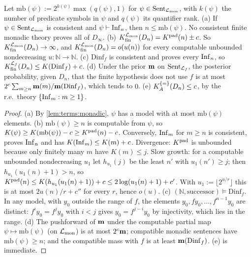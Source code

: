 \begin{theorem}\label{thm:terms:infinity}
Let $\mathrm{mb}(\psi):=2^{k(\psi)}\max(q(\psi),1)$ for $\psi\in\mathrm{Sent}_{\mathcal L_{\rm mon}}$, with $k(\psi)$ the number of predicate symbols in $\psi$ and $q(\psi)$ its quantifier rank.
(a) If $\psi\in\mathrm{Sent}_{\mathcal L_{\rm mon}}$ is consistent and $\psi\vdash\mathrm{Inf}_{n}$, then $n\le\mathrm{mb}(\psi)$. No consistent finite monadic theory proves all of $D_\infty$.
(b) $K_{\mathrm{fin}}^{\mathcal L_{\rm mon}}(D_n)=K^{\mathrm{pad}}(n)\pm c$. So $K_{\mathrm{fin}}^{\mathcal L_{\rm mon}}(D_n)\to\infty$, and $K_{\mathrm{fin}}^{\mathcal L_{\rm mon}}(D_n)=o(u(n))$ for every computable unbounded nondecreasing $u:\mathbb N\to\mathbb N$.
(c) $\mathrm{Dinf}_f$ is consistent and proves every $\mathrm{Inf}_{n}$, so $K_{\mathrm{fin}}^{\mathcal L_f}(D_n)\le K(\mathrm{Dinf}_f)+c$.
(d) Under the prior $\mathbf{m}$ on $\mathrm{Sent}_{\mathcal L_f}$, the posterior probability, given $D_n$, that the finite hypothesis does not use $f$ is at most $2^c\sum_{m\ge n}\mathbf{m}(m)/\mathbf{m}(\mathrm{Dinf}_f)$, which tends to $0$.
(e) $K_{A}^{\{=\}}(D_n)\le c$, by the r.e.\ theory $\{\mathrm{Inf}_{m}:m\ge1\}$.
\end{theorem}

\begin{proof}
(a) By \cref{lem:terms:monadic}, $\psi$ has a model with at most $\mathrm{mb}(\psi)$ elements. (b) $\mathrm{mb}(\psi)\ge n$ is computable from $\psi$, so $K(\psi)\ge K(\mathrm{mb}(\psi))-c\ge K^{\mathrm{pad}}(n)-c$. Conversely, $\mathrm{Inf}_{m}$ for $m\ge n$ is consistent, proves $\mathrm{Inf}_{n}$ and has $K(\mathrm{Inf}_{m})\le K(m)+c$. Divergence: $K^{\mathrm{pad}}$ is unbounded because only finitely many $m$ have $K(m)\le j$. Slow growth: for a computable unbounded nondecreasing $u_1$ let $h_{u_1}(j)$ be the least $n'$ with $u_1(n')\ge j$; then $h_{u_1}(u_1(n)+1)>n$, so $K^{\mathrm{pad}}(n)\le K(h_{u_1}(u_1(n)+1))+c\le2\log(u_1(n)+1)+c'$. With $u_1:=\lfloor2^{u/r}\rfloor$ this is at most $2u(n)/r+c''$ for every $r$, hence $o(u)$. (c) $(\mathbb N,\text{successor})\models\mathrm{Dinf}_f$. In any model, with $y_0$ outside the range of $f$, the elements $y_0,fy_0,\dots,f^{n-1}y_0$ are distinct: $f^iy_0=f^jy_0$ with $i<j$ gives $y_0=f^{j-i}y_0$ by injectivity, which lies in the range. (d) The pushforward of $\mathbf{m}$ under the computable partial map $\psi\mapsto\mathrm{mb}(\psi)$ (on $\mathcal L_{\rm mon}$) is at most $2^c\mathbf{m}$; compatible monadic sentences have $\mathrm{mb}(\psi)\ge n$; and the compatible mass with $f$ is at least $\mathbf{m}(\mathrm{Dinf}_f)$. (e) is immediate.
\end{proof}

